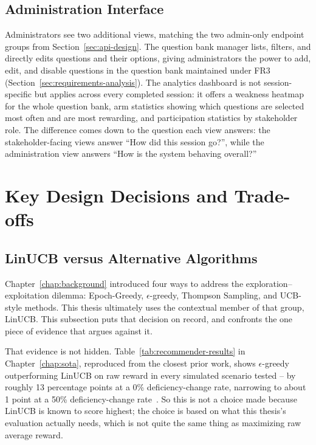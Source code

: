 \documentclass[a4paper, 12pt, oneside, openany, BCOR1cm,toc=chapterentrywithdots]{scrbook}
\begin{document}
\subsection{Administration Interface}

Administrators see two additional views, matching the two admin-only endpoint groups from
Section~\ref{sec:api-design}. The question bank manager lists, filters, and directly edits
questions and their options, giving administrators the power to add, edit, and disable questions
in the question bank maintained under FR3 (Section~\ref{sec:requirements-analysis}). The
analytics dashboard is not session-specific but applies across every completed session: it offers
a weakness heatmap for the whole question bank, arm statistics showing which questions are
selected most often and are most rewarding, and participation statistics by stakeholder role. The
difference comes down to the question each view answers: the stakeholder-facing views answer
``How did this session go?'', while the administration view answers ``How is the system behaving
overall?''

\section{Key Design Decisions and Trade-offs}
\subsection{LinUCB versus Alternative Algorithms}

Chapter~\ref{chap:background} introduced four ways to address the exploration--exploitation
dilemma: Epoch-Greedy, $\epsilon$-greedy, Thompson Sampling, and UCB-style methods. This thesis
ultimately uses the contextual member of that group, LinUCB. This subsection puts that decision
on record, and confronts the one piece of evidence that argues against it.

That evidence is not hidden. Table~\ref{tab:recommender-results} in Chapter~\ref{chap:sota},
reproduced from the closest prior work, shows $\epsilon$-greedy outperforming LinUCB on raw reward in
every simulated scenario tested -- by roughly 13 percentage points at a 0\% deficiency-change
rate, narrowing to about 1 point at a 50\% deficiency-change
rate~\cite{datsogiannis2025recommender}. So this is not a choice made because LinUCB is known to
score highest; the choice is based on what this thesis's evaluation actually needs, which is not
quite the same thing as maximizing raw average reward.
\end{document}
